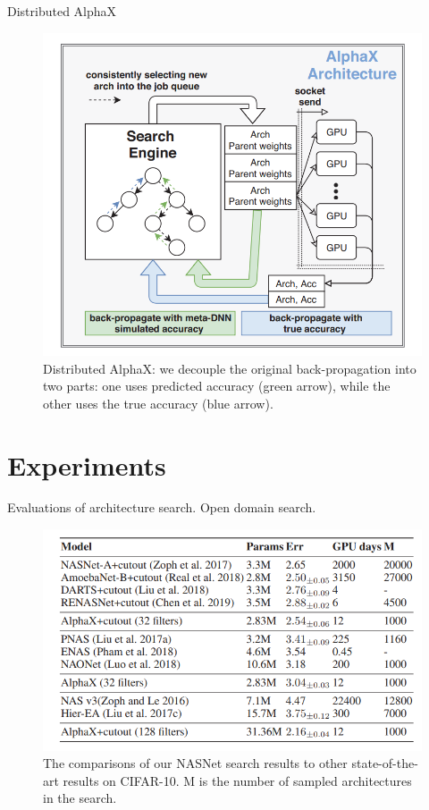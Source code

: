\documentclass{beamer}
\begin{document}
\begin{frame}{Distributed AlphaX}
\centering 

\begin{figure}
        \centering
        \includegraphics[scale=0.45]{images/nas5.png}
        \caption{Distributed AlphaX: we decouple the original
back-propagation into two parts: one uses predicted accuracy (green arrow), while the other uses the true accuracy
(blue arrow). }
    \end{figure}
 
\end{frame}


\section{Experiments} 
\begin{frame}{Evaluations of architecture search. Open domain search.}
    \begin{figure}
        \centering
        \includegraphics[scale=0.55]{images/nas8.png}
        \caption{The comparisons of our NASNet search results to
other state-of-the-art results on CIFAR-10. M is the number
of sampled architectures in the search.}
    \end{figure}
\end{frame}
\end{document}
